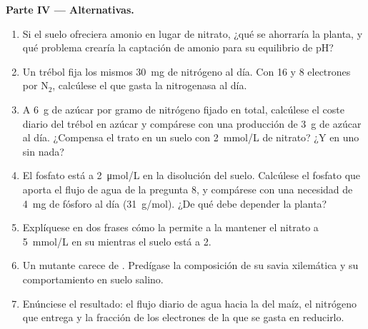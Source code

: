 \begin{problem}
\medskip
\noindent\textbf{Parte IV --- Alternativas.}
\begin{enumerate}[resume]
  \item Si el suelo ofreciera amonio en lugar de nitrato, ¿qué se ahorraría
        la planta, y qué problema crearía la captación de amonio para su
        equilibrio de pH?
  \item Un trébol fija los mismos \qty{30}{mg} de nitrógeno al día. Con
        \qty{16}{}  y \qty{8}{} electrones por $\mathrm{N_2}$,
        calcúlese el  que gasta la nitrogenasa al día.
  \item A \qty{6}{g} de azúcar por gramo de nitrógeno fijado en total,
        calcúlese el coste diario del trébol en azúcar y compárese con una
        producción de \qty{3}{g} de azúcar al día. ¿Compensa el trato en un
        suelo con \qty{2}{mmol/L} de nitrato? ¿Y en uno sin nada?
  \item El fosfato está a \qty{2}{\micro mol/L} en la disolución del suelo.
        Calcúlese el fosfato que aporta el flujo de agua de la pregunta 8, y
        compárese con una necesidad de \qty{4}{mg} de fósforo al día
        (\qty{31}{g/mol}). ¿De qué debe depender la planta?
  \item Explíquese en dos frases cómo la  permite a la 
        mantener el nitrato a \qty{5}{mmol/L} en su  mientras el suelo
        está a \qty{2}{}.
  \item Un mutante carece de . Predígase la composición de
        su savia xilemática y su comportamiento en suelo salino.
  \item Enúnciese el resultado: el flujo diario de agua hacia la  del
        maíz, el nitrógeno que entrega y la fracción de los electrones de la
         que se gasta en reducirlo.
\end{enumerate}
\end{problem}
